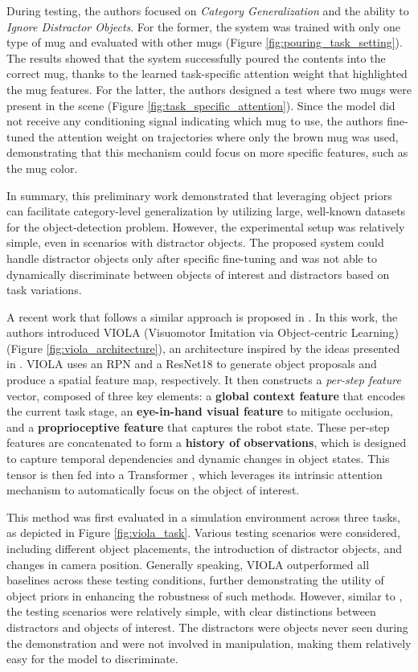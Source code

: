 During testing, the authors focused on \textit{Category Generalization} and the ability to \textit{Ignore Distractor Objects}. For the former, the system was trained with only one type of mug and evaluated with other mugs (Figure \ref{fig:pouring_task_setting}). The results showed that the system successfully poured the contents into the correct mug, thanks to the learned task-specific attention weight that highlighted the mug features. For the latter, the authors designed a test where two mugs were present in the scene (Figure \ref{fig:task_specific_attention}). Since the model did not receive any conditioning signal indicating which mug to use, the authors fine-tuned the attention weight on trajectories where only the brown mug was used, demonstrating that this mechanism could focus on more specific features, such as the mug color.


In summary, this preliminary work demonstrated that leveraging object priors can facilitate category-level generalization by utilizing large, well-known datasets for the object-detection problem. However, the experimental setup was relatively simple, even in scenarios with distractor objects. The proposed system could handle distractor objects only after specific fine-tuning and was not able to dynamically discriminate between objects of interest and distractors based on task variations.

A recent work that follows a similar approach is proposed in \cite{zhu2023viola}. In this work, the authors introduced VIOLA (Visuomotor Imitation via Object-centric Learning) (Figure \ref{fig:viola_architecture}), an architecture inspired by the ideas presented in \cite{devin2018deep}. VIOLA uses an RPN and a ResNet18 \cite{resnet} to generate object proposals and produce a spatial feature map, respectively. It then constructs a \textit{per-step feature} vector, composed of three key elements: a \textbf{global context feature} that encodes the current task stage, an \textbf{eye-in-hand visual feature} to mitigate occlusion, and a \textbf{proprioceptive feature} that captures the robot state. These per-step features are concatenated to form a \textbf{history of observations}, which is designed to capture temporal dependencies and dynamic changes in object states. This tensor is then fed into a Transformer \cite{vaswani2017attention}, which leverages its intrinsic attention mechanism to automatically focus on the object of interest.

This method was first evaluated in a simulation environment across three tasks, as depicted in Figure \ref{fig:viola_task}. Various testing scenarios were considered, including different object placements, the introduction of distractor objects, and changes in camera position. Generally speaking, VIOLA outperformed all baselines across these testing conditions, further demonstrating the utility of object priors in enhancing the robustness of such methods. However, similar to \cite{devin2018deep}, the testing scenarios were relatively simple, with clear distinctions between distractors and objects of interest. The distractors were objects never seen during the demonstration and were not involved in manipulation, making them relatively easy for the model to discriminate.

